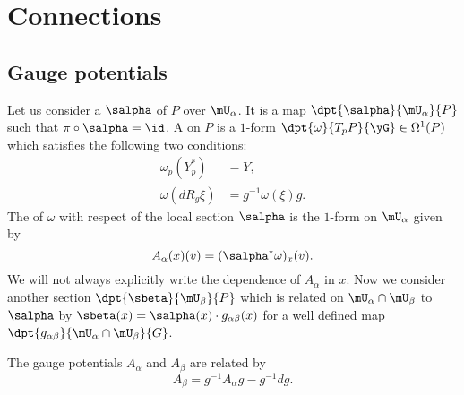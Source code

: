 \section{Connections}

\subsection{Gauge potentials}

Let us consider a  $\salpha$ of $P$ over $\mU_{\alpha}$. It is a map $\dpt{\salpha}{\mU_{\alpha}}{P}$ such that $\pi\circ\salpha=\id$. A  on $P$ is a $1$-form $\dpt{\omega}{T_pP}{\yG}\in\Omega^1(P)$ which satisfies the following two conditions:
\begin{subequations}
\begin{align}
   \omega_p(Y^*_p)&=Y,   \label{conn_1}\\
   \omega(dR_g\xi)&=g^{-1}\omega(\xi)g.\label{conn_2}
\end{align}
\end{subequations}
The  of $\omega$ with respect of the local section\label{PgLocSecConn} $\salpha$ is  the $1$-form on $\mU_{\alpha}$ given by
\begin{equation}
          A_{\alpha}(x)(v)=(\salpha^*\omega)_x(v).
\end{equation}
We will not always explicitly write the dependence of $A_{\alpha}$ in $x$. Now we consider another section $\dpt{\sbeta}{\mU_{\beta}}{P}$ which is related on $\mU_{\alpha}\cap\mU_{\beta}$ to $\salpha$ by $\sbeta(x)=\salpha(x)\cdot g_{\alpha\beta}(x)$ for a well defined map $\dpt{g_{\alpha\beta}}{\mU_{\alpha}\cap\mU_{\beta}}{G}$.

\begin{proposition}
The gauge potentials $A_{\alpha}$ and $A_{\beta}$ are related by
\begin{equation}\label{trans_A}
                A_{\beta}=g^{-1} A_{\alpha} g-g^{-1} dg.
\end{equation}
\label{prop:trans_A}
\end{proposition}

